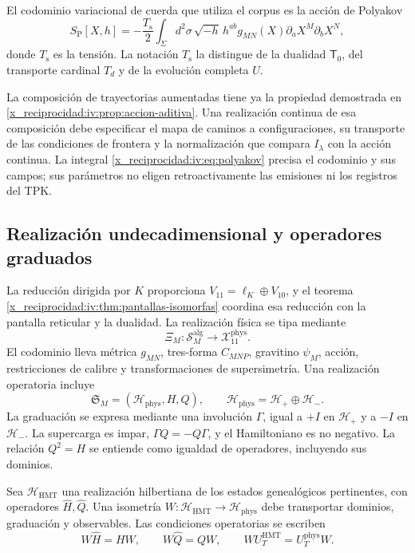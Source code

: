 El codominio variacional de cuerda que utiliza el corpus
es la acción de Polyakov
\begin{equation}
 S_{\mathrm P}[X,h]
 =-\frac{T_{\mathrm s}}2\int_\Sigma d^2\sigma\,
 \sqrt{-h}\,h^{ab}g_{MN}(X)
             \partial_aX^M\partial_bX^N,
 \label{x_reciprocidad:iv:eq:polyakov}
\end{equation}
donde \(T_{\mathrm s}\) es la tensión. La notación
\(T_{\mathrm s}\) la distingue de la dualidad
\(\mathsf T_0\), del transporte cardinal \(T_d\)
y de la evolución completa \(U\).

La composición de trayectorias aumentadas tiene ya la
propiedad demostrada en \ref{x_reciprocidad:iv:prop:accion-aditiva}.
Una realización continua de esa composición debe
especificar el mapa de caminos a configuraciones,
su transporte de las condiciones de frontera y la
normalización que compara \(I_\lambda\) con la acción
continua. La integral \eqref{x_reciprocidad:iv:eq:polyakov} precisa
el codominio y sus campos; sus parámetros no eligen
retroactivamente las emisiones ni los registros del TPK.

\subsection{Realización undecadimensional y operadores graduados}

La reducción dirigida por \(K\) proporciona
\(V_{11}=\ell_K\oplus V_{10}\), y el teorema
\ref{x_reciprocidad:iv:thm:pantallas-isomorfas} coordina esa reducción
con la pantalla reticular y la dualidad. La realización
física se tipa mediante
\[
 \Xi_M:\mathscr S_M^{\mathrm{alg}}
                  \longrightarrow\mathcal X_{11}^{\mathrm{phys}}.
\]
El codominio lleva métrica \(g_{MN}\), tres-forma
\(C_{MNP}\), gravitino \(\psi_M\), acción,
restricciones de calibre y transformaciones de
supersimetría. Una realización operatoria incluye
\[
 \mathfrak S_M=(\mathcal H_{\mathrm{phys}},H,Q),\qquad
 \mathcal H_{\mathrm{phys}}=\mathcal H_+\oplus\mathcal H_-.
\]
La graduación se expresa mediante una involución
\(\Gamma\), igual a \(+I\) en \(\mathcal H_+\)
y a \(-I\) en \(\mathcal H_-\). La supercarga
es impar, \(\Gamma Q=-Q\Gamma\), y el
Hamiltoniano es no negativo. La relación
\(Q^2=H\) se entiende como igualdad de operadores,
incluyendo sus dominios.

Sea \(\mathcal H_{\mathrm{HMT}}\) una realización
hilbertiana de los estados genealógicos pertinentes,
con operadores \(\widehat H,\widehat Q\). Una
isometría \(W:\mathcal H_{\mathrm{HMT}}\to
\mathcal H_{\mathrm{phys}}\) debe transportar
dominios, graduación y observables. Las condiciones
operatorias se escriben
\begin{equation}
 W\widehat H=HW,\qquad
 W\widehat Q=QW,\qquad
 WU_T^{\mathrm{HMT}}=U_T^{\mathrm{phys}}W.
 \label{x_reciprocidad:iv:eq:entrelazamiento-fisico}
\end{equation}

